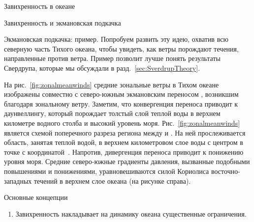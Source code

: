 \begin{chapter}{Завихренность в океане}
\begin{section}{Завихренность и экмановская подкачка}
\begin{paragraph}{Экмановская подкачка: пример.}
Попробуем развить эту идею, охватив всю северную часть Тихого океана, 
чтобы увидеть, как ветры порождают течения, направленные против ветра. 
Пример позволит лучше понять результаты Свердрупа, которые мы обсуждали
в разд.~\ref{sec:SverdrupTheory}.
%

На рис.~\ref{fig:zonalmeanwinds} средние зональные ветры в Тихом океане
изображены совместно с северо-южным экмановским переносом%
, возникшим благодаря зональному
ветру. Заметим, что конвергенция переноса 
приводит к даунвеллингу, который порождает толстый слой теплой воды 
в верхнем километре водного столба и высокий уровень моря. 
Рис.~\ref{fig:zonalmeanwinds} является схемой поперечного разреза
региона между  и . На ней прослеживается область,
занятая теплой водой, в верхнем километровом слое воды с центром в точке 
с координатой~.
Напротив, дивергенция переноса приводит к понижению уровня моря. 
Средние северо-южные градиенты давления, вызванные подобными повышениями 
и понижениями, уравновешиваются силой Кориолиса восточно-западных 
течений в верхнем слое океана 
(на рисунке справа).
%
\end{paragraph}
\end{section}

\begin{section}{Основные концепции}
\begin{enumerate}
\item
Завихренность накладывает на динамику океана существенные ограничения. 
%


\end{enumerate}
\end{section}
\end{chapter}
